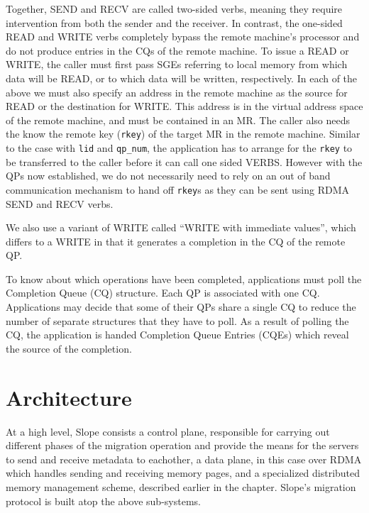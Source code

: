 Together, SEND and RECV are called two-sided verbs, meaning they require
intervention from both the sender and the receiver. In contrast, the one-sided
READ and WRITE verbs completely bypass the remote machine's processor and do not
produce entries in the CQs of the remote machine. To
issue a READ or WRITE, the caller must first pass SGEs referring to local memory
from which data will be READ, or to which data will be written, respectively.
In each of the above we must also specify an address in the remote machine
as the source for READ or the destination for WRITE. This address is in
the virtual address space of the remote machine, and must be contained in an
MR. The caller also needs the know the remote key (\texttt{rkey}) of the target
MR in the remote machine. Similar to the case with \texttt{lid} and
\texttt{qp\_num}, the application has to arrange for the \texttt{rkey} to be
transferred to the caller before it can call one sided VERBS. However with the
QPs now established, we do not necessarily need to rely on an out of band
communication mechanism to hand off \texttt{rkey}s as they can be sent using
RDMA SEND and RECV verbs.

We also use a variant of WRITE called ``WRITE with immediate values'', which
differs to a WRITE in that it generates a completion in the CQ of the
remote QP.

To know about which operations have been completed, applications must poll the
Completion Queue (CQ) structure.
Each QP is associated with one CQ. Applications may decide that some of their
QPs share a single CQ to reduce the number of separate structures that they
have to poll. As a result of polling the CQ, the application is handed
Completion Queue Entries (CQEs) which reveal the source of the completion.


\section{Architecture}
At a high level, Slope consists a control plane, responsible for carrying out
different phases of the migration operation and provide the means for the
servers to send and receive metadata to eachother, a data plane, in this case
over RDMA which handles sending and receiving memory pages,
and a specialized distributed memory management scheme, described earlier in the
chapter. Slope's migration protocol is built atop the above sub-systems.


